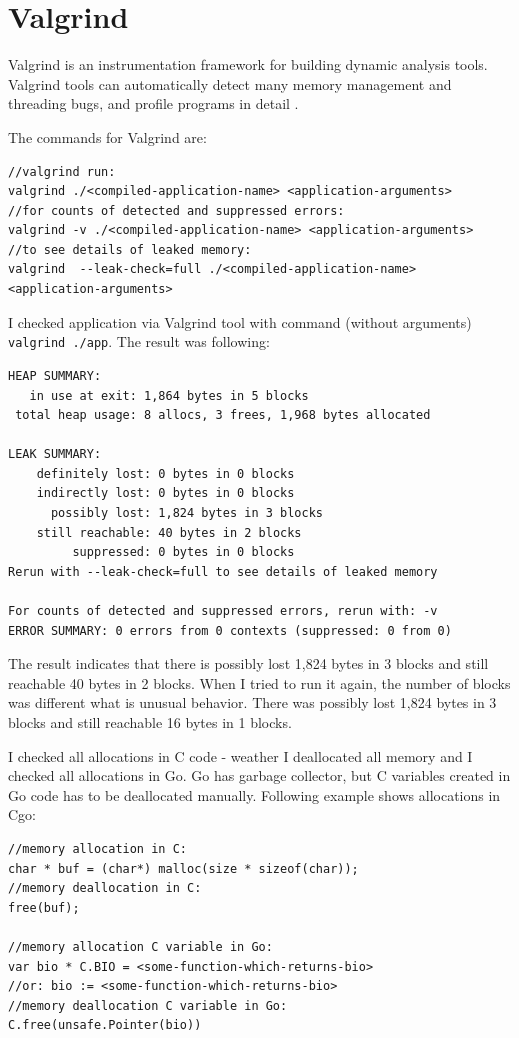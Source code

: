 \documentclass[
  12pt, 
  digital, %
  notable,   %
  nolof,     %
  nolot,     %
]{fithesis3}
\begin{document}

\section{Valgrind}
Valgrind is an instrumentation framework for building dynamic analysis tools. Valgrind tools can 
automatically detect many memory management and threading bugs, and profile programs in detail 
\cite{valgrind}.

The commands for Valgrind are:
\begin{lstlisting}
//valgrind run:
valgrind ./<compiled-application-name> <application-arguments>
//for counts of detected and suppressed errors:
valgrind -v ./<compiled-application-name> <application-arguments>
//to see details of leaked memory:
valgrind  --leak-check=full ./<compiled-application-name> <application-arguments>
\end{lstlisting}

I checked application via Valgrind tool with command (without arguments) \texttt{valgrind ./app}.
The result was following:
\begin{lstlisting}
HEAP SUMMARY:
   in use at exit: 1,864 bytes in 5 blocks
 total heap usage: 8 allocs, 3 frees, 1,968 bytes allocated

LEAK SUMMARY:
    definitely lost: 0 bytes in 0 blocks
    indirectly lost: 0 bytes in 0 blocks
      possibly lost: 1,824 bytes in 3 blocks
    still reachable: 40 bytes in 2 blocks
         suppressed: 0 bytes in 0 blocks
Rerun with --leak-check=full to see details of leaked memory

For counts of detected and suppressed errors, rerun with: -v
ERROR SUMMARY: 0 errors from 0 contexts (suppressed: 0 from 0)
\end{lstlisting}

The result indicates that there is possibly lost 1,824 bytes in 3 blocks and still reachable 40 
bytes in 2 blocks. When I tried to run it again, the number of blocks was different what is 
unusual behavior. There was possibly lost 1,824 bytes in 3 blocks and still reachable 16 bytes in 
1 blocks. 

I checked all allocations in C code - weather I deallocated all memory and I checked all 
allocations in Go. Go has garbage collector, but C variables created in Go code has to be 
deallocated manually. Following example shows allocations in Cgo:
\begin{lstlisting}
//memory allocation in C:
char * buf = (char*) malloc(size * sizeof(char));
//memory deallocation in C:
free(buf);

//memory allocation C variable in Go:
var bio * C.BIO = <some-function-which-returns-bio>
//or: bio := <some-function-which-returns-bio>
//memory deallocation C variable in Go:
C.free(unsafe.Pointer(bio))
\end{lstlisting}
\end{document}
